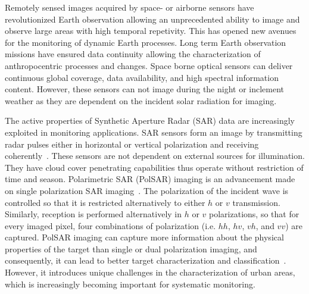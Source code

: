 





Remotely sensed images acquired by space- or airborne sensors have revolutionized Earth observation allowing an unprecedented ability to image and observe large areas  with high temporal repetivity. 
This has opened new avenues for the monitoring of dynamic Earth processes. Long term Earth observation missions have ensured data continuity allowing the characterization of anthropocentric processes and changes. Space borne optical sensors can deliver continuous global coverage, data availability, and high spectral information content. However, these sensors can not image during the night or inclement weather as they are dependent on the incident solar radiation for imaging. 

The active properties of Synthetic Aperture Radar (SAR) data are increasingly exploited in monitoring applications. SAR sensors form an image by transmitting radar pulses  either in horizontal or vertical polarization and receiving  coherently~\cite{curlander1991synthetic}.  These sensors are not dependent on external sources for illumination. They have cloud cover penetrating capabilities thus operate without restriction of time and season.  Polarimetric SAR (PolSAR) imaging is an advancement made on single polarization SAR imaging~\cite{van1992nasa}. The polarization of the incident wave is controlled so that it is restricted alternatively to either $h$ or $v$ transmission. Similarly, reception is performed alternatively in $h$ or $v$ polarizations, so that for every imaged pixel, four combinations of polarization (i.e. $hh$, $hv$, $vh$, and $vv$) are captured. PolSAR imaging can capture more information about the physical properties of the target than single or dual polarization imaging, and consequently, it can lead to better target characterization and classification~\cite{Lee2001multipolclass}. However, it introduces unique challenges in the characterization of urban areas, which is increasingly becoming important for systematic monitoring.

